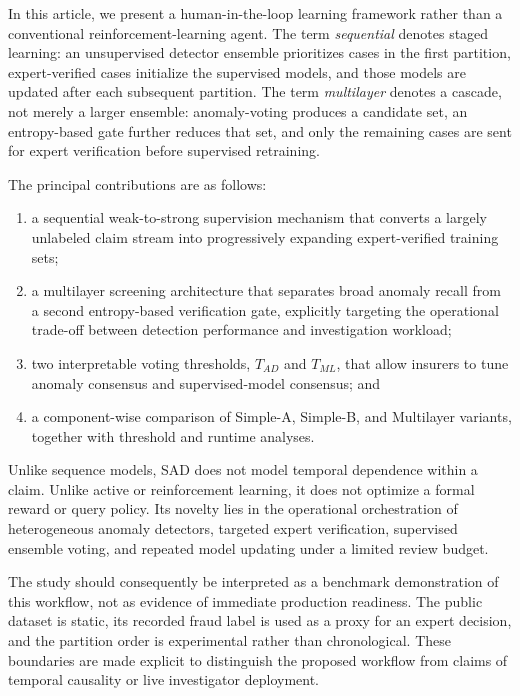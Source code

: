 \documentclass[12pt]{article}
\begin{document}

In this article, we present a human-in-the-loop learning framework rather
than a conventional reinforcement-learning agent. The term
\emph{sequential} denotes staged learning: an unsupervised detector ensemble
prioritizes cases in the first partition, expert-verified cases initialize the
supervised models, and those models are updated after each subsequent
partition. The term \emph{multilayer} denotes a cascade, not merely a larger
ensemble: anomaly-voting produces a candidate set, an entropy-based gate
further reduces that set, and only the remaining cases are sent for expert
verification before supervised retraining.

The principal contributions are as follows:
\begin{enumerate}[label=(\roman*),leftmargin=*]
  \item a sequential weak-to-strong supervision mechanism that converts a
  largely unlabeled claim stream into progressively expanding expert-verified
  training sets;
  \item a multilayer screening architecture that separates broad anomaly
  recall from a second entropy-based verification gate, explicitly targeting
  the operational trade-off between detection performance and investigation
  workload;
  \item two interpretable voting thresholds, $T_{AD}$ and $T_{ML}$, that allow
  insurers to tune anomaly consensus and supervised-model consensus; and
  \item a component-wise comparison of Simple-A, Simple-B, and Multilayer
  variants, together with threshold and runtime analyses.
\end{enumerate}

Unlike sequence models, SAD does not model temporal dependence within a
claim. Unlike active or reinforcement learning, it does not optimize a formal
reward or query policy. Its novelty lies in the operational orchestration of
heterogeneous anomaly detectors, targeted expert verification, supervised
ensemble voting, and repeated model updating under a limited review budget.

The study should consequently be interpreted as a benchmark demonstration of
this workflow, not as evidence of immediate production readiness. The public
dataset is static, its recorded fraud label is used as a proxy for an expert
decision, and the partition order is experimental rather than chronological.
These boundaries are made explicit to distinguish the proposed workflow from
claims of temporal causality or live investigator deployment.
\end{document}
